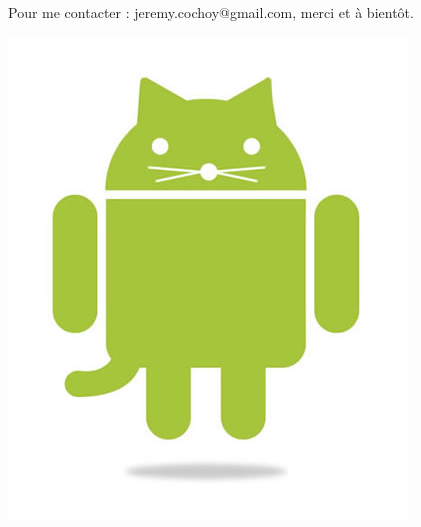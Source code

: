 \documentclass{beamer}
\begin{document}
\begin{frame}
\begin{center}
Pour me contacter : jeremy.cochoy@gmail.com, merci et à bientôt.

\medskip
\medskip
\medskip
\medskip

\includegraphics[scale=0.3]{android_cat.jpg}
\end{center}
\end{frame}
\end{document}
